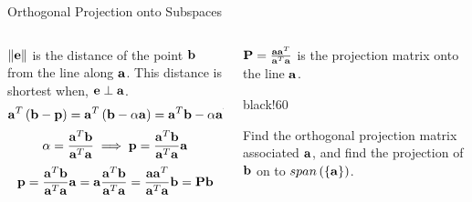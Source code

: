 \documentclass[aspectratio=169]{beamer}
\def\mf{\ensuremath\mathbf}
\def\lp{\ensuremath\left(}
\def\rp{\ensuremath\right)}
\newcommand{\demoex}[2]{\onslide<#1->\begin{color}{black!60} #2 \end{color}}
\begin{document}
\begin{frame}[t]{Orthogonal Projection onto Subspaces}
\begin{columns}
\begin{column}{0.6\textwidth}
\vspace{-0.65cm}
\begin{center}
\end{center}
\vspace{-0.2cm}
$\left\lVert \mf{e}\right\rVert$ is the distance of the point $\mf{b}$ from the line along $\mf{a}$. This distance is shortest when, $\mf{e} \perp \mf{a}$.
\[ \mf{a}^T\left(\mf{b} - \mf{p}\right) = \mf{a}^T\left(\mf{b} - \alpha \mf{a}\right) = \mf{a}^T\mf{b} - \alpha \mf{a}^T\mf{a} = 0 \]
\[ \alpha = \frac{\mf{a}^T\mf{b}}{\mf{a}^T\mf{a}} \implies \mf{p} = \frac{\mf{a}^T\mf{b}}{\mf{a}^T\mf{a}}\mf{a} \]
\[ \mf{p} = \frac{\mf{a}^T\mf{b}}{\mf{a}^T\mf{a}}\mf{a} =  \mf{a}\frac{\mf{a}^T\mf{b}}{\mf{a}^T\mf{a}} = \frac{\mf{a}\mf{a}^T}{\mf{a}^T\mf{a}}\mf{b} = \mf{Pb} \]
\end{column}
\begin{column}{0.4\textwidth}
$\mf{P} = \frac{\mf{aa}^T}{\mf{a}^T\mf{a}}$ is the projection matrix onto the line $\mf{a}$.

\vspace{0.25cm}

\demoex{2}{
\begin{small}
Find the orthogonal projection matrix associated $\mf{a}$, and find the projection of $\mf{b}$ on to $span \lp\left\{\mf{a}\right\}\rp$.\vspace{0.2cm}


\end{small}}
\end{column}
\end{columns}
\end{frame}
\end{document}
